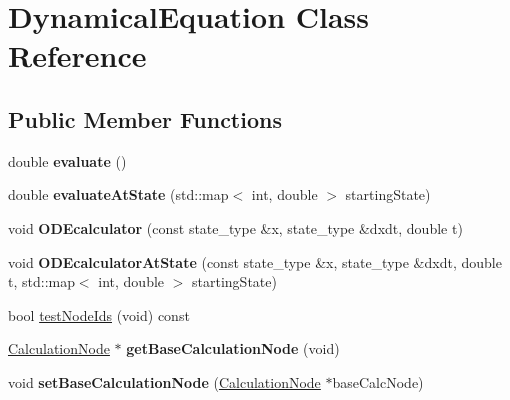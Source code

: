 \hypertarget{classDynamicalEquation}{}\section{Dynamical\+Equation Class Reference}
\label{classDynamicalEquation}
\subsection*{Public Member Functions}
\begin{DoxyCompactItemize}
\item 
double {\bfseries evaluate} ()\hypertarget{classDynamicalEquation_ac353d833e23a7718d28b48b96f273100}{}\label{classDynamicalEquation_ac353d833e23a7718d28b48b96f273100}

\item 
double {\bfseries evaluate\+At\+State} (std\+::map$<$ int, double $>$ starting\+State)\hypertarget{classDynamicalEquation_adf9454ebe570a95e2b4d72c04bdc82cc}{}\label{classDynamicalEquation_adf9454ebe570a95e2b4d72c04bdc82cc}

\item 
void {\bfseries O\+D\+Ecalculator} (const state\+\_\+type \&x, state\+\_\+type \&dxdt, double t)\hypertarget{classDynamicalEquation_a153f3c990807c596142b45d9f63ab57c}{}\label{classDynamicalEquation_a153f3c990807c596142b45d9f63ab57c}

\item 
void {\bfseries O\+D\+Ecalculator\+At\+State} (const state\+\_\+type \&x, state\+\_\+type \&dxdt, double t, std\+::map$<$ int, double $>$ starting\+State)\hypertarget{classDynamicalEquation_a07a6f24e0ca820c3734545c7d5d65927}{}\label{classDynamicalEquation_a07a6f24e0ca820c3734545c7d5d65927}

\item 
bool \hyperlink{classDynamicalEquation_adbf7e8bad4b2764922b0ba2fe077b297}{test\+Node\+Ids} (void) const 
\item 
\hyperlink{classCalculationNode}{Calculation\+Node} $\ast$ {\bfseries get\+Base\+Calculation\+Node} (void)\hypertarget{classDynamicalEquation_aaa39d24b8dff72907638441db262c127}{}\label{classDynamicalEquation_aaa39d24b8dff72907638441db262c127}

\item 
void {\bfseries set\+Base\+Calculation\+Node} (\hyperlink{classCalculationNode}{Calculation\+Node} $\ast$base\+Calc\+Node)\hypertarget{classDynamicalEquation_a62f51fc853ccfa0aa2a09c3f2385eebe}{}\label{classDynamicalEquation_a62f51fc853ccfa0aa2a09c3f2385eebe}


\end{DoxyCompactItemize}
